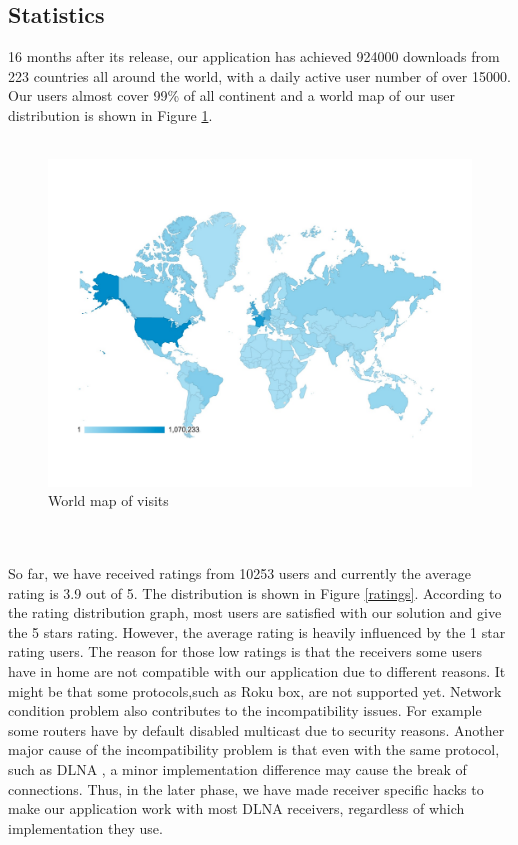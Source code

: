 \subsection{Statistics}
16 months after its release, our application has achieved 924000 downloads from 223 countries all around the world, with a daily active user number of over 15000. Our users almost cover 99\% of all continent and a world map of our user distribution is shown in Figure \ref{user_map}. \\
\\
\begin{figure}[htb]
\centering \includegraphics[width=14cm]{charts/session_world_map}
\caption{World map of visits \label{user_map}}
\end{figure}\\
\\
So far, we have received ratings from 10253 users and currently the average rating is 3.9 out of 5. The distribution is shown in Figure \ref{ratings}. According to the rating distribution graph, most users are satisfied with our solution and give the 5 stars rating. However, the average rating is heavily influenced by the 1 star rating users. The reason for those low ratings is that the receivers some users have in home are not compatible with our application due to different reasons. It might be that some protocols,such as Roku box, are not supported yet. Network condition problem also contributes to the incompatibility issues. For example some routers have by default disabled multicast due to security reasons. Another major cause of the incompatibility problem is that even with the same protocol, such as DLNA , a minor implementation difference may cause the break of connections. Thus, in the later phase, we have made receiver specific hacks to make our application work with most DLNA receivers, regardless of which implementation they use.\\
